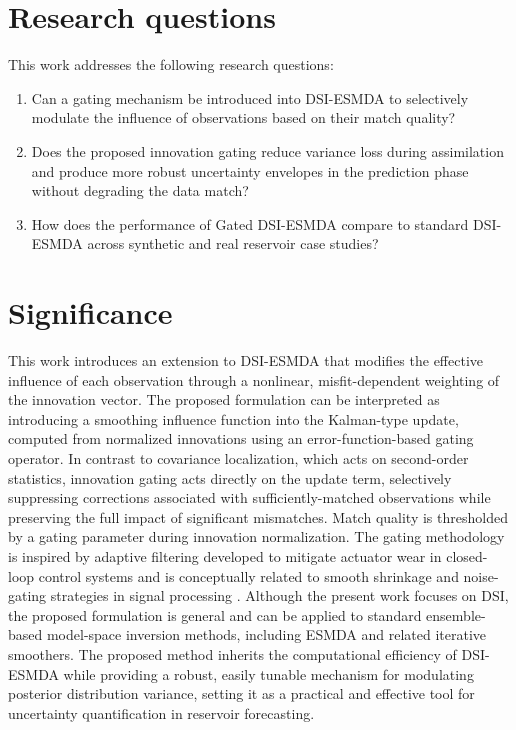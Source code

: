 \section{Research questions}
\label{sec:research-questions}

    This work addresses the following research questions:
    \begin{enumerate}
        \item Can a gating mechanism be introduced into DSI-ESMDA to selectively modulate the influence of observations based on their match quality?
        \item Does the proposed innovation gating reduce variance loss during assimilation and produce more robust uncertainty envelopes in the prediction phase without degrading the data match?
        \item How does the performance of Gated DSI-ESMDA compare to standard DSI-ESMDA across synthetic and real reservoir case studies?
    \end{enumerate}

\section{Significance}

    This work introduces an extension to DSI-ESMDA that modifies the effective influence of each observation 
    through a nonlinear, misfit-dependent weighting of the innovation vector.
    The proposed formulation can be interpreted as introducing a smoothing influence function into the Kalman-type update, 
    computed from normalized innovations using an error-function-based gating operator.
    In contrast to covariance localization, which acts on second-order statistics, innovation gating acts directly on the update term, 
    selectively suppressing corrections associated with sufficiently-matched observations
    while preserving the full impact of significant mismatches.
    Match quality is thresholded by a gating parameter during innovation normalization.
    The gating methodology is inspired by adaptive filtering developed to mitigate actuator wear in closed-loop control systems 
    \cite{Fortaleza:2022} 
    and is conceptually related to smooth shrinkage and noise-gating strategies in signal processing 
    \cite{Donoho:1994,Donoho:1995}.
    Although the present work focuses on DSI, the proposed formulation 
    is general and can be applied to standard ensemble-based model-space inversion methods, 
    including ESMDA and related iterative smoothers.
    The proposed method inherits the computational efficiency of DSI-ESMDA while providing a robust, 
    easily tunable mechanism for modulating posterior distribution variance,
    setting it as a practical and effective tool for uncertainty quantification in reservoir forecasting.
    
